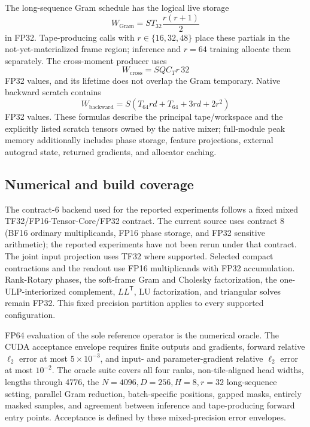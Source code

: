 \documentclass[10pt]{article}
\newcommand{\T}{\mathsf{T}}
\begin{document}
The long-sequence Gram schedule has the logical live storage
\begin{equation}
    W_{\mathrm{Gram}}
    =S T_{32}\frac{r(r+1)}{2}
\label{eq:cuda-gram-workspace}
\end{equation}
in FP32.  Tape-producing calls with $r\in\{16,32,48\}$ place these partials in
the not-yet-materialized frame region; inference and $r=64$ training allocate
them separately.  The cross-moment producer uses
\begin{equation}
    W_{\mathrm{cross}}=S Q C_T r\,32
\label{eq:cuda-cross-workspace}
\end{equation}
FP32 values, and its lifetime does not overlap the Gram temporary.  Native
backward scratch contains
\begin{equation}
    W_{\mathrm{backward}}
    =S(T_{64}rd+T_{64}+3rd+2r^2)
\label{eq:cuda-backward-workspace}
\end{equation}
FP32 values.  These formulas describe the principal tape/workspace and the
explicitly listed scratch tensors owned by the native mixer; full-module peak
memory additionally includes phase storage, feature projections, external
autograd state, returned gradients, and allocator caching.

\subsection{Numerical and build coverage}

The contract-6 backend used for the reported experiments follows a fixed mixed TF32/FP16-Tensor-Core/FP32 contract. The current source uses contract 8 (BF16 ordinary multiplicands, FP16 phase storage, and FP32 sensitive arithmetic); the reported experiments have not been rerun under that contract.  The
joint input projection uses TF32 where supported.  Selected compact
contractions and the readout use FP16 multiplicands with FP32 accumulation.
Rank-Rotary phases, the soft-frame Gram and Cholesky factorization, the
one-ULP-interiorized complement, $LL^\T$, LU factorization, and triangular
solves remain FP32.  This fixed precision partition applies to every supported
configuration.

FP64 evaluation of the sole reference operator is the numerical oracle.  The
CUDA acceptance envelope requires finite outputs and gradients, forward
relative $\ell_2$ error at most $5\times10^{-3}$, and input- and
parameter-gradient relative $\ell_2$ error at most $10^{-2}$.  The oracle suite
covers all four ranks,
non-tile-aligned head widths, lengths through 4776, the
$N=4096,D=256,H=8,r=32$ long-sequence setting, parallel Gram reduction,
batch-specific positions, gapped masks, entirely masked samples, and agreement
between inference and tape-producing forward entry points.  Acceptance is
defined by these mixed-precision error envelopes.
\end{document}
